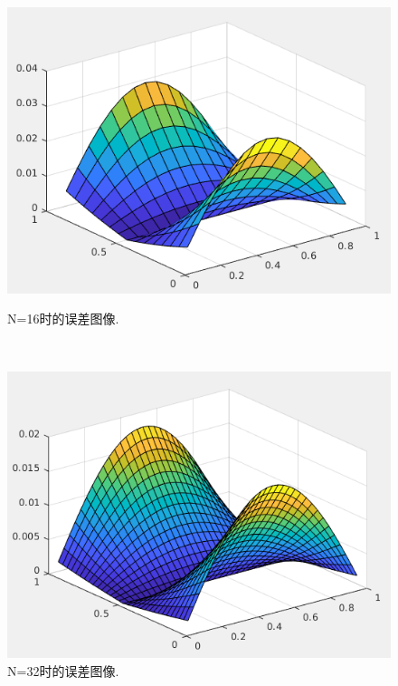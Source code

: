 \documentclass[12pt,a4paper]{article}
\begin{document}
\begin{figure}[ht]
	\begin{minipage}[t]{0.4\linewidth}%
		\centering     %
		\includegraphics[width=1.2\textwidth]{./figures/n16.png}
		\caption{N=16时的误差图像.}%
		\label{fig:liuchengtu1}%
	\end{minipage} 
	\hfill
	\begin{minipage}[t]{0.4\linewidth}
		\centering
		\includegraphics[width=1.2\textwidth]{./figures/n32.png}
		\caption{N=32时的误差图像.}%
		\label{fig:liuchengtu2}
	\end{minipage}
\end{figure}
\newpage
\end{document}
